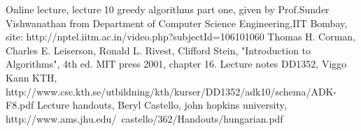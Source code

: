 \begin{thebibliography}{99}
 Online lecture, lecture 10 greedy algorithms part one, given by Prof.Sunder Vishwanathan from Department of Computer Science Engineering,IIT Bombay, site: http://nptel.iitm.ac.in/video.php?subjectId=106101060
Thomas H. Corman, Charles E. Leiserson, Ronald L. Rivest, Clifford Stein, "Introduction to Algorithms", 4th ed. MIT press 2001, chapter 16.
Lecture notes DD1352, Viggo Kann KTH, http://www.csc.kth.se/utbildning/kth/kurser/DD1352/adk10/schema/ADK-F8.pdf
Lecture handouts, Beryl Castello, john hopkins university, http://www.ams.jhu.edu/~castello/362/Handouts/hungarian.pdf
\end{thebibliography}
